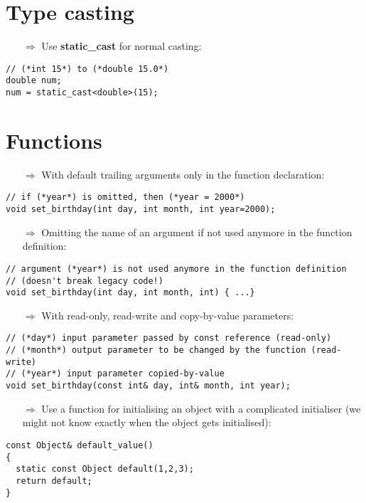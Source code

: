 \documentclass[10pt]{article}
\begin{document}
\section{Type casting}
\small
\begin{enumerate}
\item[$\Rightarrow$] Use \textbf{static\_cast} for normal casting:
\end{enumerate}
\begin{lstlisting}
// (*int 15*) to (*double 15.0*)
double num;
num = static_cast<double>(15);
\end{lstlisting}
%
%
\section{Functions}
\small
\begin{enumerate}
\item[$\Rightarrow$] With default trailing arguments only in the function declaration:
\end{enumerate}
\begin{lstlisting}
// if (*year*) is omitted, then (*year = 2000*)
void set_birthday(int day, int month, int year=2000);
\end{lstlisting}
\begin{enumerate}
\item[$\Rightarrow$] Omitting the name of an argument if not used anymore in the function definition:
\end{enumerate}
\begin{lstlisting}
// argument (*year*) is not used anymore in the function definition
// (doesn't break legacy code!)
void set_birthday(int day, int month, int) { ...}
\end{lstlisting}
\begin{enumerate}
\item[$\Rightarrow$] With read-only, read-write and copy-by-value parameters:
\end{enumerate}
\begin{lstlisting}
// (*day*) input parameter passed by const reference (read-only)
// (*month*) output parameter to be changed by the function (read-write)
// (*year*) input parameter copied-by-value
void set_birthday(const int& day, int& month, int year);
\end{lstlisting}
\begin{enumerate}
\item[$\Rightarrow$] Use a function for initialising an object with a complicated initialiser (we might not
know exactly when the object gets initialised):
\end{enumerate}
\begin{lstlisting}
const Object& default_value()
{
  static const Object default(1,2,3);
  return default;
}
\end{lstlisting}
\end{document}
